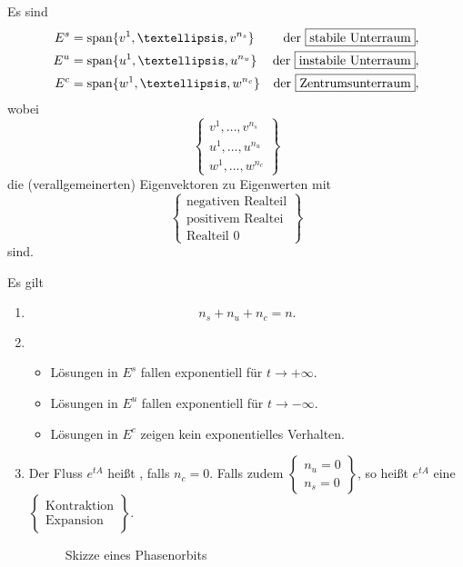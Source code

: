 \documentclass[main.tex]{subfiles}
\begin{document}
\setcounter{chapter}{2}
\setcounter{section}{3}

\setcounter{satz}{7}
\begin{mydef}\label{2.8}
Es sind 
\begin{align*}
    E^s &= \lin{ v^1, …, v^{n_s}} & \text{der \bemph{stabile Unterraum}},\\
    E^u &= \lin{ u^1, …, u^{n_u}} &\text{der \bemph{instabile Unterraum}},\\
    E^c &= \lin{w^1, …, w^{n_c}} &\text{der \bemph{Zentrumsunterraum}},
\end{align*}
wobei 
$$
\left\{ \begin{matrix}
v^1, …, v^{n_s}\\
u^1, …, u^{n_u}\\
w^1, …, w^{n_c}\end{matrix}\right\}
$$
die (verallgemeinerten) Eigenvektoren zu Eigenwerten mit
$$
\left\{ \begin{matrix}
\text{negativen Realteil}\\
\text{positivem Realtei}\\
\text{Realteil 0}
\end{matrix}\right\}
$$
sind.
\end{mydef}
\begin{bem}\label{2.9}
Es gilt
\begin{enumerate}[label=(\alph*)]
    \item $$n_s + n_u + n_c = n.$$
    \item \begin{itemize}
        \item Lösungen in $E^s$ fallen exponentiell für $t\to + \infty$.
        \item Lösungen in $E^u$ fallen exponentiell für $t\to - \infty$.
        \item Lösungen in $E^c$ zeigen kein exponentielles Verhalten.
    \end{itemize}
    \item Der Fluss $e^{tA}$ heißt , falls $n_c = 0$. Falls zudem $\left\{ \begin{matrix} n_u = 0\\ n_s = 0\end{matrix}\right\}$, so heißt $e^{tA}$ eine $\left\{ \begin{matrix} \text{{Kontraktion}}\\\text{{Expansion}} \end{matrix}\right\}$.
    
    \begin{figure}[h!]
        \centering
        
        \caption{Skizze eines Phasenorbits}
    \end{figure}
    
\end{enumerate}
\end{bem}
\end{document}
